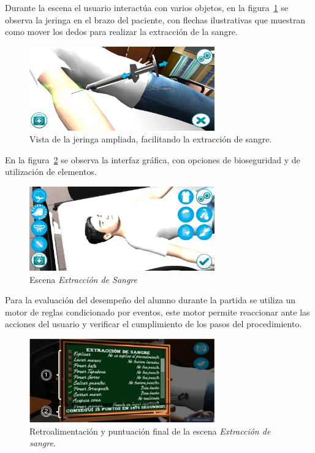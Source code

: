 Durante la escena el usuario interactúa con varios objetos, en la
figura~\ref{fig:hemocultivo_jeringa_zoom} se observa la jeringa en el brazo del
paciente, con flechas ilustrativas que muestran como mover los dedos para
realizar la extracción de la sangre.

\begin{figure}
\centering 
\includegraphics[width=8cm]{../solucion/images/hemocultivo_jeringa_ampliada.jpg}
\caption{Vista de la jeringa ampliada, facilitando la extracción de sangre.}
\label{fig:hemocultivo_jeringa_zoom}
\end{figure}

En la figura~\ref{fig:hemocultivo_gui} se observa la interfaz gráfica, con
opciones de bioseguridad y de utilización de elementos.

\begin{figure}
\centering
\includegraphics[width=8cm]{../solucion/images/hemocultivo_gui.jpg}
\caption{Escena \emph{Extracción de Sangre}}
\label{fig:hemocultivo_gui}
\end{figure}

Para la evaluación del desempeño del alumno durante la partida se utiliza un motor
de reglas condicionado por eventos\cite{bailey2004event,behrends2006combining},
este motor permite reaccionar ante las acciones del usuario y verificar el
cumplimiento de los pasos del procedimiento. 

\begin{figure}
\centering 
\includegraphics[width=8cm]{../solucion/images/hemocultivo_retroalimentacion.jpg}
\caption{Retroalimentación y puntuación final de la escena \emph{Extracción de
        sangre}.}
\label{fig:hemocultivo_retroalimentacion}
\end{figure}

